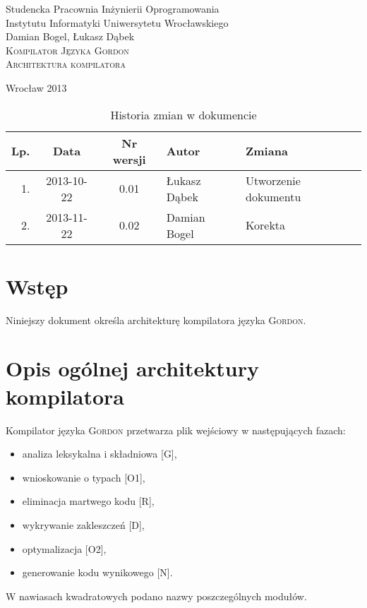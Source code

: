 \documentclass{documentation}
\begin{document}
\begin{titlepage}
\begin{center}
Studencka Pracownia Inżynierii Oprogramowania\\
Instytutu Informatyki Uniwersytetu Wrocławskiego\\[6cm]

Damian Bogel, Łukasz Dąbek\\[1cm]
\textsc{\LARGE Kompilator Języka Gordon}\\[0.5cm]
\textsc{\large Architektura kompilatora}

\vfill
Wrocław 2013 \\[2.5cm]

\end{center}
\end{titlepage}

\newpage
\begin{table}
	\centering
    \captionsetup{name=Tabela,labelsep=period,labelsep=period}
	\caption{Historia zmian w dokumencie}
		\begin{tabular}{|r|c|c|l|l|}
		\hline
		Lp.  & Data       & Nr wersji & Autor                 & Zmiana \\ \hline
		1.   & 2013-10-22 & 0.01 & Łukasz Dąbek & Utworzenie dokumentu \\ \hline
		2.   & 2013-11-22 & 0.02 & Damian Bogel & Korekta \\ \hline
	\end{tabular}
\end{table}
\newpage

\tableofcontents
\setcounter{page}{2}

\newpage

\section{Wstęp}
\noindent Niniejszy dokument określa architekturę kompilatora języka
\textsc{Gordon}.

\section{Opis ogólnej architektury kompilatora}
\noindent Kompilator języka \textsc{Gordon} przetwarza plik wejściowy w
następujących fazach:
\begin{itemize}
    \item analiza leksykalna i składniowa [G],
    \item wnioskowanie o typach [O1],
    \item eliminacja martwego kodu [R],
    \item wykrywanie zakleszczeń [D], 
    \item optymalizacja [O2],
    \item generowanie kodu wynikowego [N].
\end{itemize}
W nawiasach kwadratowych podano nazwy poszczególnych modułów.
\end{document}

